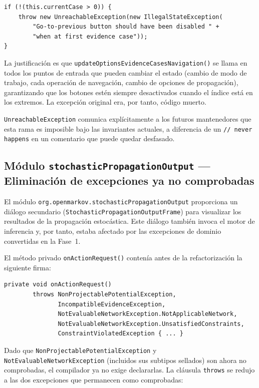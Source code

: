 \documentclass[12pt,a4paper]{article}
\begin{document}
\begin{lstlisting}[caption={Guarda en goToPreviousEvidenceCase tras la refactorización}]
if (!(this.currentCase > 0)) {
    throw new UnreachableException(new IllegalStateException(
        "Go-to-previous button should have been disabled " +
        "when at first evidence case"));
}
\end{lstlisting}

La justificación es que \texttt{updateOptionsEvidenceCasesNavigation()} se llama
en todos los puntos de entrada que pueden cambiar el estado (cambio de modo de
trabajo, cada operación de navegación, cambio de opciones de propagación),
garantizando que los botones estén siempre desactivados cuando el índice está en
los extremos. La excepción original era, por tanto, código muerto.

\texttt{UnreachableException} comunica explícitamente a los futuros
mantenedores que esta rama es imposible bajo las invariantes actuales, a
diferencia de un \texttt{// never happens} en un comentario que puede quedar
desfasado.

\subsection{Módulo \texttt{stochasticPropagationOutput} — Eliminación de excepciones
ya no comprobadas}
\label{sec:stochastic}

El módulo \texttt{org.openmarkov.stochasticPropagationOutput} proporciona un
diálogo secundario (\texttt{StochasticPropagationOutputFrame}) para visualizar
los resultados de la propagación estocástica. Este diálogo también invoca el
motor de inferencia y, por tanto, estaba afectado por las excepciones de dominio
convertidas en la Fase~1.

El método privado \texttt{onActionRequest()} contenía antes de la refactorización
la siguiente firma:

\begin{lstlisting}[caption={Firma antes en StochasticPropagationOutputFrame}]
private void onActionRequest()
        throws NonProjectablePotentialException,
               IncompatibleEvidenceException,
               NotEvaluableNetworkException.NotApplicableNetwork,
               NotEvaluableNetworkException.UnsatisfiedConstraints,
               ConstraintViolatedException { ... }
\end{lstlisting}

Dado que \texttt{NonProjectablePotentialException} y
\texttt{NotEvaluableNetworkException} (incluidos sus subtipos sellados) son
ahora no comprobadas, el compilador ya no exige declararlas. La cláusula
\texttt{throws} se redujo a las dos excepciones que permanecen como comprobadas:
\end{document}
